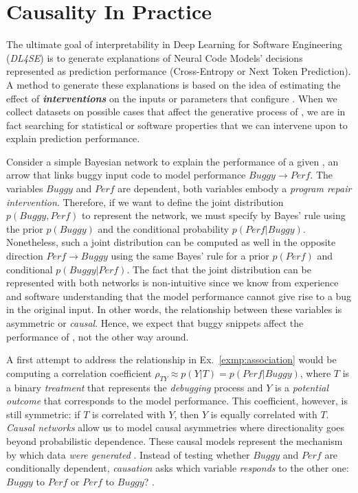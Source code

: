 \section{Causality In Practice}
\label{sec:ci4se}

The ultimate goal of interpretability in Deep Learning for Software Engineering (\textit{DL4SE}) is to generate explanations of Neural Code Models' decisions represented as prediction performance (\ie Cross-Entropy or Next Token Prediction). A method to generate these explanations is based on the idea of estimating the effect of \textbf{\textit{interventions}} on the inputs or parameters that configure \nlms. When we collect datasets on possible cases that affect the generative process of \nlms, we are in fact searching for statistical or software properties that we can intervene upon to explain prediction performance. 

\begin{exmp}
\label{exmp:association}
Consider a simple Bayesian network to explain the performance of a given \nlm, an arrow that links buggy input code to model performance $Buggy\to Perf$. The variables $Buggy$ and $Perf$ are dependent, both variables embody a \textit{program repair intervention}. Therefore, if we want to define the joint distribution $p(Buggy,Perf)$ to represent the network, we must specify by Bayes' rule using the prior $p(Buggy)$ and the conditional probability $p(Perf|Buggy)$. Nonetheless, such a joint distribution can be computed as well in the opposite direction  $Perf\to Buggy$ using the same Bayes' rule for a prior $p(Perf)$ and conditional $p(Buggy|Perf)$. The fact that the joint distribution can be represented with both networks is non-intuitive since we know from experience and software understanding that the model performance cannot give rise to a bug in the original input. In other words, the relationship between these variables is asymmetric or \textit{causal}. Hence, we expect that buggy snippets affect the performance of \nlms, not the other way around.
\end{exmp}

A first attempt to address the relationship in Ex.~\ref{exmp:association} would be computing a correlation coefficient $\rho_{TY}\approx p(Y|T)=p(Perf|Buggy)$, where $T$ is a binary \textit{treatment} that represents the \textit{debugging} process and $Y$ is a \textit{potential outcome} that corresponds to the model performance. This coefficient, however, is still symmetric: if $T$ is correlated with $Y$, then $Y$ is equally correlated with $T$. \textit{Causal networks} allow us to model causal asymmetries where directionality goes beyond probabilistic dependence. These causal models represent the mechanism by which data \textit{were generated} \cite{Pearl2016Causality}. Instead of testing whether $Buggy$ and $Perf$ are conditionally dependent, \textit{causation} asks which variable \textit{responds} to the other one: $Buggy$ to $Perf$ or $Perf$ to $Buggy$? \cite{Pearl2016Causality}.


